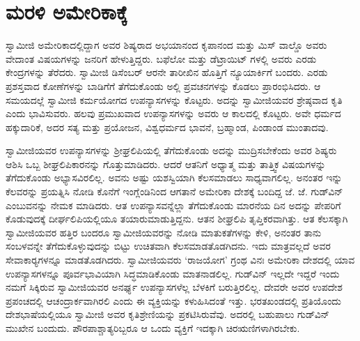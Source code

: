 
\chapter{ಮರಳಿ ಅಮೇರಿಕಾಕ್ಕೆ }

 ಸ್ವಾಮೀಜಿ ಅಮೇರಿಕಾದಲ್ಲಿದ್ದಾಗ ಅವರ ಶಿಷ್ಯರಾದ ಅಭಯಾನಂದ ಕೃಪಾನಂದ ಮತ್ತು ಮಿಸ್ ವಾಲ್ಡೊ ಅವರು ವೇದಾಂತ ವಿಷಯಗಳನ್ನು ಜನರಿಗೆ ಹೇಳುತ್ತಿದ್ದರು. ಬಫೆಲೋ ಮತ್ತು ಡೆಟ್ರಾಯಿಟ್ ಗಳಲ್ಲಿ ಅವರು ಎರಡು ಕೇಂದ್ರಗಳನ್ನು ತೆರೆದರು. ಸ್ವಾಮೀಜಿ ಡಿಸೆಂಬರ್ ಆರನೇ ತಾರೀಖಿನ ಹೊತ್ತಿಗೆ ನ್ಯೂಯಾರ್ಕಿಗೆ ಬಂದರು. ಎರಡು ಪ್ರಶಸ್ತವಾದ ಕೋಣೆಗಳನ್ನು ಬಾಡಿಗೆಗೆ ತೆಗೆದುಕೊಂಡು ಅಲ್ಲಿ ಪ್ರವಚನಗಳನ್ನು ಕೊಡಲು ಪ್ರಾರಂಭಿಸಿದರು. ಆ ಸಮಯದಲ್ಲೆ ಸ್ವಾಮೀಜಿ ಕರ್ಮಯೋಗದ ಉಪನ್ಯಾಸಗಳನ್ನು ಕೊಟ್ಟರು. ಅದನ್ನು ಸ್ವಾಮೀಜಿಯವರ ಶ್ರೇಷ್ಠವಾದ ಕೃತಿ ಎಂದು ಭಾವಿಸುವರು. ಹಲವು ಪ್ರಮುಖವಾದ ಉಪನ್ಯಾಸಗಳನ್ನು ಅವರು ಆ ಕಾಲದಲ್ಲಿ ಕೊಟ್ಟರು. ಅವೇ ಧರ್ಮದ ಹಕ್ಕುದಾರಿಕೆ, ಅದರ ಸತ್ಯ ಮತ್ತು ಪ್ರಯೋಜನ, ವಿಶ್ವಧರ್ಮದ ಭಾವನೆ, ಬ್ರಹ್ಮಾಂಡ, ಪಿಂಡಾಂಡ ಮುಂತಾದವು. 

 ಸ್ವಾಮೀಜಿಯವರ ಉಪನ್ಯಾಸಗಳನ್ನು ಶ‍್ರೀಘ್ರಲಿಪಿಯಲ್ಲಿ ತೆಗೆದುಕೊಂಡು ಅದನ್ನು ಮುದ್ರಿಸಬೇಕೆಂದು ಅವರ ಶಿಷ್ಯರು ಆಶಿಸಿ ಒಬ್ಬ ಶೀಘ್ರಲಿಪಿಕಾರನನ್ನು ಗೊತ್ತುಮಾಡಿದರು. ಆದರೆ ಆತನಿಗೆ ಅಧ್ಯಾತ್ಮ ಮತ್ತು ತಾತ್ತ್ವಿಕ ವಿಷಯಗಳನ್ನು ತೆಗೆದುಕೊಂಡು ಅಭ್ಯಾಸವಿರಲಿಲ್ಲ. ಅವನು ಅಷ್ಟು ಯಶಸ್ವಿಯಾಗಿ ಕೆಲಸಮಾಡಲು ಸಾಧ್ಯವಾಗಲಿಲ್ಲ. ಅನಂತರ ಇನ್ನು ಕೆಲವರನ್ನು ಪ್ರಯತ್ನಿಸಿ ನೋಡಿ ಕೊನೆಗೆ ಇಂಗ್ಲೆಂಡಿನಿಂದ ಆಗತಾನೆ ಅಮೇರಿಕಾ ದೇಶಕ್ಕೆ ಬಂದಿದ್ದ ಜೆ. ಜೆ. ಗುಡ್‍ವಿನ್ ಎಂಬುವನನ್ನು ನೇಮಕ ಮಾಡಿದರು. ಆತ ಉಪನ್ಯಾಸವನ್ನೆಲ್ಲಾ ತೆಗೆದುಕೊಂಡು ಮಾರನೆಯ ದಿನ ಅದನ್ನು ಪೇಪರಿಗೆ ಕೊಡುವುದಕ್ಕೆ ದೀರ್ಘಲಿಪಿಯಲ್ಲಿಯೂ ತಯಾರುಮಾಡುತ್ತಿದ್ದನು. ಆತನ ಶೀಘ್ರಲಿಪಿ ತೃಪ್ತಿಕರವಾಗಿತ್ತು. ಆತ ಕೆಲಸಕ್ಕಾಗಿ ಸ್ವಾಮೀಜಿಯವರ ಹತ್ತಿರ ಬಂದರೂ ಸ್ವಾಮೀಜಿಯವರನ್ನು ನೋಡಿ ಮಾತುಕತೆಗಳನ್ನು ಕೇಳಿ, ಅನಂತರ ತಾನು ಸಂಬಳವನ್ನೇ ತೆಗೆದುಕೊಳ್ಳುವುದನ್ನು ಬಿಟ್ಟು ಉಚಿತವಾಗಿ ಕೆಲಸಮಾಡತೊಡಗಿದನು. ಇದು ಮಾತ್ರವಲ್ಲದೆ ಅವರ ಸೇವಾಕಾರ‍್ಯಗಳನ್ನೂ ಮಾಡತೊಡಗಿದರು. ಸ್ವಾಮೀಜಿಯವರು ‘ರಾಜಯೋಗ’ ಗ್ರಂಥ ವಿನಃ ಅಮೇರಿಕಾ ದೇಶದಲ್ಲಿ ಯಾವ ಉಪನ್ಯಾಸಗಳನ್ನೂ ಪೂರ್ವಭಾವಿಯಾಗಿ ಸಿದ್ಧಮಾಡಿಕೊಂಡು ಮಾತನಾಡಲಿಲ್ಲ. ಗುಡ್‍ವಿನ್ ಇಲ್ಲದೇ ಇದ್ದರೆ ಇಂದು ನಮಗೆ ಸಿಕ್ಕಿರುವ ಸ್ವಾಮೀಜಿಯವರ ಅನರ್ಘ್ಯ ಉಪನ್ಯಾಸಗಳೆಲ್ಲ ಬೆಳಕಿಗೆ ಬರುತ್ತಿರಲಿಲ್ಲ. ದೇವರೇ ಅವರ ಉಪದೇಶ ಪ್ರಪಂಚದಲ್ಲಿ ಆಚಂದ್ರಾರ್ಕವಾಗಿರಲಿ ಎಂದು ಈ ವ್ಯಕ್ತಿಯನ್ನು ಕಳುಹಿಸಿದಂತೆ ಇತ್ತು. ಭರತಖಂಡದಲ್ಲಿ ಪ್ರತಿಯೊಂದು ದೇಶಭಾಷೆಯಲ್ಲಿಯೂ ಸ್ವಾಮೀಜಿ ಅವರ ಕೃತಿಶ್ರೇಣಿಯನ್ನು ಪ್ರಕಟಿಸಿರುವೆವು. ಅದರಲ್ಲಿ ಬಹುಪಾಲು ಗುಡ್‍ವಿನ್ ಮುಖೇನ ಬಂದುದು. ಪೌರಪಾಶ್ಚಾತ್ಯರಿಬ್ಬರೂ ಆ ಒಂದು ವ್ಯಕ್ತಿಗೆ ಇದಕ್ಕಾಗಿ ಚಿರಋಣಿಗಳಾಗಿರಬೇಕು. 

